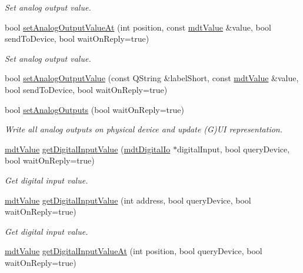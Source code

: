 \begin{DoxyCompactItemize}
\begin{DoxyCompactList}\small\item\em Set analog output value. \end{DoxyCompactList}\item 
bool \hyperlink{classmdt_multi_io_device_acae80f372402f588a5ed5b6cc2dcf8a4}{set\-Analog\-Output\-Value\-At} (int position, const \hyperlink{classmdt_value}{mdt\-Value} \&value, bool send\-To\-Device, bool wait\-On\-Reply=true)
\begin{DoxyCompactList}\small\item\em Set analog output value. \end{DoxyCompactList}\item 
bool \hyperlink{classmdt_multi_io_device_a71adf951efb818d4b4dd412ac4a233c1}{set\-Analog\-Output\-Value} (const Q\-String \&label\-Short, const \hyperlink{classmdt_value}{mdt\-Value} \&value, bool send\-To\-Device, bool wait\-On\-Reply=true)
\item 
bool \hyperlink{classmdt_multi_io_device_ab01987c9487499d144d9d756979e3b42}{set\-Analog\-Outputs} (bool wait\-On\-Reply=true)
\begin{DoxyCompactList}\small\item\em Write all analog outputs on physical device and update (G)U\-I representation. \end{DoxyCompactList}\item 
\hyperlink{classmdt_value}{mdt\-Value} \hyperlink{classmdt_multi_io_device_a13385548121864e4507e92eda5f396db}{get\-Digital\-Input\-Value} (\hyperlink{classmdt_digital_io}{mdt\-Digital\-Io} $\ast$digital\-Input, bool query\-Device, bool wait\-On\-Reply=true)
\begin{DoxyCompactList}\small\item\em Get digital input value. \end{DoxyCompactList}\item 
\hyperlink{classmdt_value}{mdt\-Value} \hyperlink{classmdt_multi_io_device_aa05a6e3e1f82fded7b7bc4086dbf6af2}{get\-Digital\-Input\-Value} (int address, bool query\-Device, bool wait\-On\-Reply=true)
\begin{DoxyCompactList}\small\item\em Get digital input value. \end{DoxyCompactList}\item 
\hyperlink{classmdt_value}{mdt\-Value} \hyperlink{classmdt_multi_io_device_a657ee52addf4b0ed0b1878497f64a74a}{get\-Digital\-Input\-Value\-At} (int position, bool query\-Device, bool wait\-On\-Reply=true)

\end{DoxyCompactItemize}
